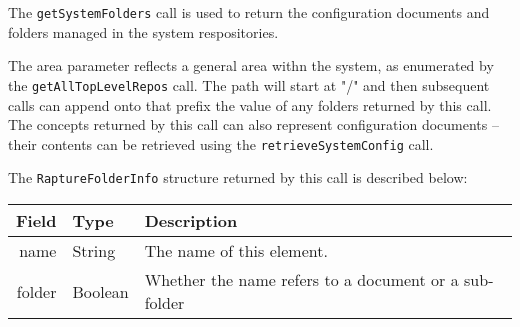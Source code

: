 The \verb+getSystemFolders+ call is used to return the configuration documents and folders managed in the system respositories.

The area parameter reflects a general area withn the system, as enumerated by the \verb+getAllTopLevelRepos+ call. The path will start at
"/" and then subsequent calls can append onto that prefix the value of any folders returned by this call. The concepts returned by this call
can also represent configuration documents -- their contents can be retrieved using the \verb+retrieveSystemConfig+ call.

The \verb+RaptureFolderInfo+ structure returned by this call is described below:

\begin{table}[ht]
\begin{center}
\begin{tabular}{r l p{8cm}}
  Field & Type & Description \\
  \hline
  name & String & The name of this element. \\
  folder & Boolean & Whether the name refers to a document or a sub-folder \\
\end{tabular}
\end{center}
\end{table}
